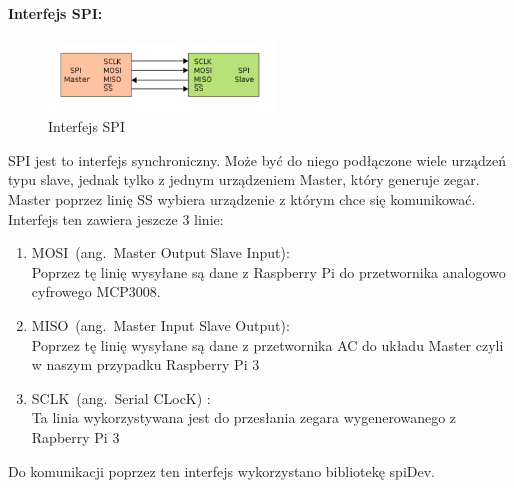 \paragraph{Interfejs SPI:}
\begin{figure}[h]
	\centering
	\includegraphics[width=6cm]{SPI.png}
	\caption{Interfejs SPI}
\end{figure}
SPI jest to interfejs synchroniczny. Może być do niego podłączone wiele urządzeń typu slave, jednak tylko z jednym urządzeniem Master, który generuje zegar. Master poprzez linię SS wybiera urządzenie z którym chce się komunikować.  \\
Interfejs ten zawiera jeszcze 3 linie:
\begin{enumerate} 
\item MOSI (ang. Master Output Slave Input): \\
Poprzez tę linię wysyłane są dane z Raspberry Pi do przetwornika analogowo cyfrowego MCP3008.
\item MISO (ang. Master Input Slave Output):\\
Poprzez tę linię wysyłane są dane z przetwornika AC do układu Master czyli w naszym przypadku Raspberry Pi 3
\item SCLK (ang. Serial CLocK) :\\
Ta linia wykorzystywana jest do przesłania zegara wygenerowanego z Rapberry Pi 3
\end{enumerate}
Do komunikacji poprzez ten interfejs wykorzystano bibliotekę spiDev. \\


